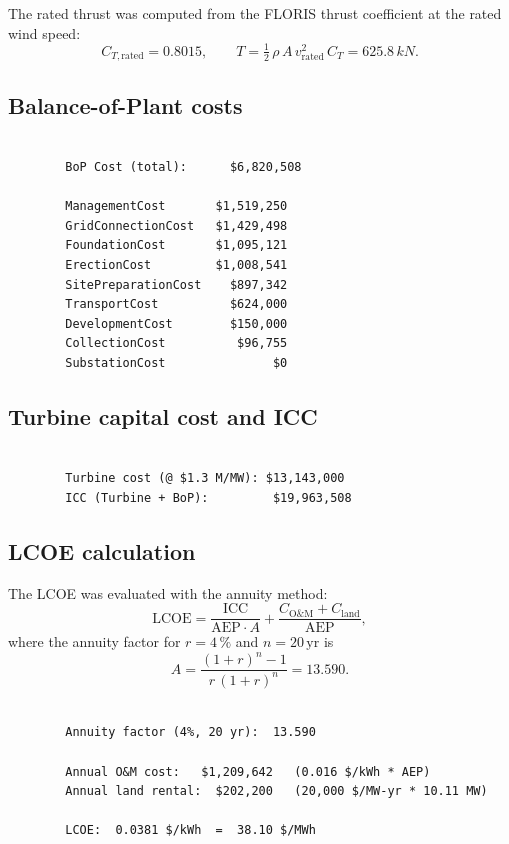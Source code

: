 \documentclass[11pt,a4paper]{article}
\begin{document}
	The rated thrust was computed from the FLORIS thrust coefficient at the rated
	wind speed:
	\[
	C_{T,\text{rated}} = 0.8015, \qquad
	T = \tfrac{1}{2}\,\rho\, A\, v_{\text{rated}}^2\, C_T
	= 625.8\,kN.
	\]
	
	\newpage
	
	\subsection{Balance-of-Plant costs}
	
	\begin{lstlisting}
		
		BoP Cost (total):      $6,820,508
		
		ManagementCost       $1,519,250
		GridConnectionCost   $1,429,498
		FoundationCost       $1,095,121
		ErectionCost         $1,008,541
		SitePreparationCost    $897,342
		TransportCost          $624,000
		DevelopmentCost        $150,000
		CollectionCost          $96,755
		SubstationCost               $0
	\end{lstlisting}
	
	\subsection{Turbine capital cost and ICC}
	
	\begin{lstlisting}
		
		Turbine cost (@ $1.3 M/MW): $13,143,000
		ICC (Turbine + BoP):         $19,963,508
	\end{lstlisting}
	
	\subsection{LCOE calculation}
	
	The LCOE was evaluated with the annuity method:
	\[
	\mathrm{LCOE}
	= \frac{\mathrm{ICC}}{\mathrm{AEP}\cdot A}
	+ \frac{C_{\mathrm{O\&M}} + C_{\mathrm{land}}}{\mathrm{AEP}},
	\]
	where the annuity factor for $r = 4\,\%$ and $n = 20\,\text{yr}$ is
	\[
	A = \frac{(1+r)^n - 1}{r\,(1+r)^n} = 13.590.
	\]
	
	\begin{lstlisting}
		
		Annuity factor (4%, 20 yr):  13.590
		
		Annual O&M cost:   $1,209,642   (0.016 $/kWh * AEP)
		Annual land rental:  $202,200   (20,000 $/MW-yr * 10.11 MW)
		
		LCOE:  0.0381 $/kWh  =  38.10 $/MWh
	\end{lstlisting}
	
\end{document}
